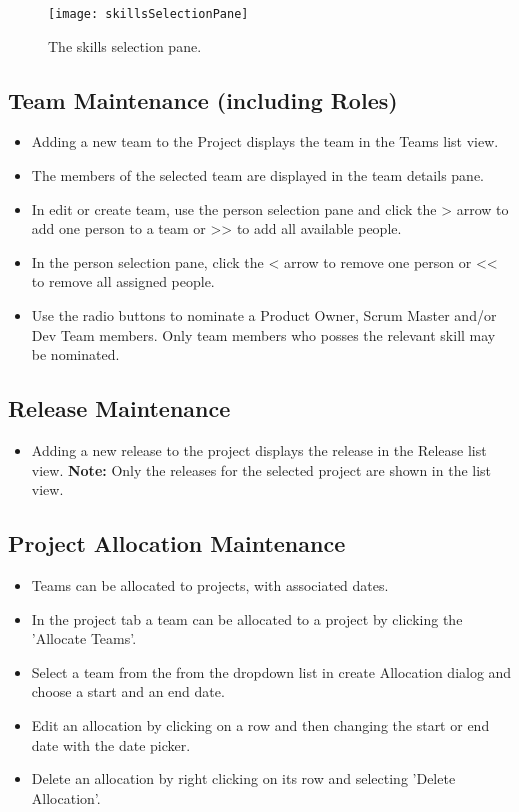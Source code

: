 \documentclass[11pt,fleqn]{book} %
\begin{document}
\begin{figure}[H]
  \centering
  \texttt{[image: skillsSelectionPane]}
  \caption{The skills selection pane.\label{skillsSelectionPane}}
\end{figure}

\subsection{Team Maintenance (including Roles)}
\begin{itemize}
  \item Adding a new team to the Project displays the team in the Teams list view. 
  \item The members of the selected team are displayed in the team details pane.
  \item In edit or create team, use the person selection pane and click the > arrow to add one person to a team or >> to add all available people.
  \item In the person selection pane, click the < arrow to remove one person or << to remove all assigned people. 
  \item Use the radio buttons to nominate a Product Owner, Scrum Master and/or Dev Team members. Only team members who posses the relevant skill may be nominated.
\end{itemize}


\subsection{Release Maintenance}
\begin{itemize}
  \item Adding a new release to the project displays the release in the Release list view.
    \textbf{Note:} Only the releases for the selected project are shown in the list view.
\end{itemize}

\subsection{Project Allocation Maintenance}
\begin{itemize}
  \item Teams can be allocated to projects, with associated dates.
  \item In the project tab a team can be allocated to a project by clicking the 'Allocate Teams'.
  \item Select a team from the from the dropdown list in create Allocation dialog and choose a start and an end date.
  \item Edit an allocation by clicking on a row and then changing the start or end date with the date picker.
  \item Delete an allocation by right clicking on its row and selecting 'Delete Allocation'.
\end{itemize}
\end{document}
